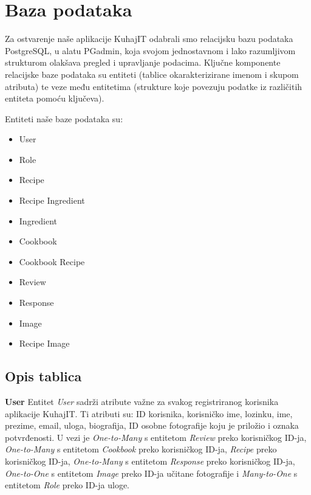 		\section{Baza podataka}

		Za ostvarenje naše aplikacije KuhajIT odabrali smo relacijsku bazu podataka PostgreSQL, u alatu PGadmin, koja svojom jednostavnom i lako razumljivom strukturom olakšava pregled i upravljanje podacima. Ključne komponente relacijske baze podataka su entiteti (tablice okarakterizirane imenom i skupom atributa) te veze među entitetima (strukture koje povezuju podatke iz različitih entiteta pomoću ključeva).
		
		Entiteti naše baze podataka su:
		\begin{itemize}
			\item User
			\item Role
			\item Recipe
			\item Recipe Ingredient
			\item Ingredient
			\item Cookbook
			\item Cookbook Recipe
			\item Review
			\item Response
			\item Image
			\item Recipe Image
		\end{itemize}
		
		
			\subsection{Opis tablica}
				
				\textbf{User} Entitet \textit{User} sadrži atribute važne za svakog registriranog korisnika aplikacije KuhajIT. Ti atributi su: ID korisnika, korisničko ime, lozinku, ime, prezime, email, uloga, biografija, ID osobne fotografije koju je priložio i oznaka potvrđenosti. U vezi je \textit{One-to-Many} s entitetom \textit{Review} preko korisničkog ID-ja, \textit{One-to-Many} s entitetom \textit{Cookbook} preko korisničkog ID-ja, \textit{Recipe} preko korisničkog ID-ja, \textit{One-to-Many} s entitetom \textit{Response} preko korisničkog ID-ja, \textit{One-to-One} s entitetom \textit{Image} preko ID-ja učitane fotografije i \textit{Many-to-One} s entitetom \textit{Role} preko ID-ja uloge.
				
